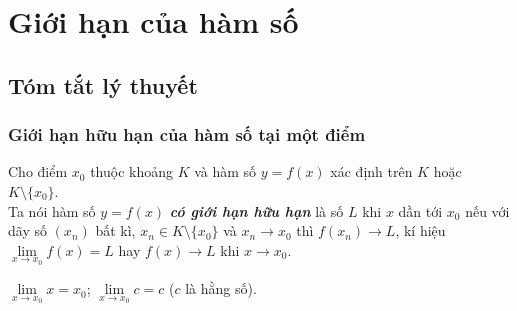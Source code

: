 \section{Giới hạn của hàm số}
\setcounter{dang}{0}
\subsection{Tóm tắt lý thuyết}
\begin{tomtat}
	\subsubsection{Giới hạn hữu hạn của hàm số tại một điểm}
	
	\begin{dn}
		Cho điểm $ x_0 $ thuộc khoảng $ K $ và hàm số $ y=f(x) $ xác định trên $ K $ hoặc $ K\setminus\{x_0\} $.\\
		Ta nói hàm số $ y=f(x) $ \textbf{\textit{có giới hạn hữu hạn}} là số $ L $ khi $ x $ dần tới $ x_0 $ nếu với dãy số $ (x_n) $ bất kì, $ x_n\in K\setminus\{x_0\} $ và $ x_n \to x_0 $ thì $ f(x_n)\to L $, kí hiệu $ \lim \limits_{x \to x_0} f(x) =L$ hay $ f(x)\to L $ khi $ x\to x_0 $.
	\end{dn}
	
	\begin{note} 
		$ \lim \limits_{x \to x_0} x=x_0 $; \quad $ \lim \limits_{x \to x_0} c=c $ ($ c $ là hằng số).
	\end{note} 

\end{tomtat}
